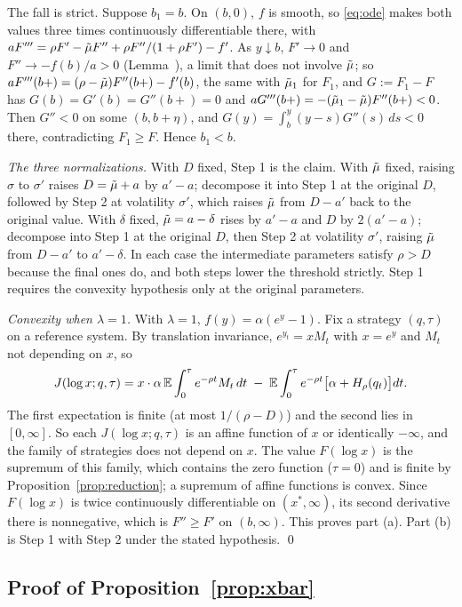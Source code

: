 The fall is strict. Suppose $b_1=b$. On $(b,0)$, $f$ is smooth, so \eqref{eq:ode} makes both values three times continuously differentiable there, with $aF'''=\rho F'-\tilde\mu F''+\rho F''/(1+\rho F')-f'$. As $y\downarrow b$, $F'\to0$ and $F''\to-f(b)/a>0$ (Lemma~), a limit that does not involve $\tilde\mu$; so $aF'''(b+)=(\rho-\tilde\mu)F''(b+)-f'(b)$, the same with $\tilde\mu_1$ for $F_1$, and $G:=F_1-F$ has $G(b)=G'(b)=G''(b+)=0$ and $aG'''(b+)=-(\tilde\mu_1-\tilde\mu)F''(b+)<0$. Then $G''<0$ on some $(b,b+\eta)$, and $G(y)=\int_b^y(y-s)G''(s)\,ds<0$ there, contradicting $F_1\ge F$. Hence $b_1<b$.

\emph{The three normalizations.} With $D$ fixed, Step 1 is the claim. With $\tilde\mu$ fixed, raising $\sigma$ to $\sigma'$ raises $D=\tilde\mu+a$ by $a'-a$; decompose it into Step 1 at the original $D$, followed by Step 2 at volatility $\sigma'$, which raises $\tilde\mu$ from $D-a'$ back to the original value. With $\delta$ fixed, $\tilde\mu=a-\delta$ rises by $a'-a$ and $D$ by $2(a'-a)$; decompose into Step 1 at the original $D$, then Step 2 at volatility $\sigma'$, raising $\tilde\mu$ from $D-a'$ to $a'-\delta$. In each case the intermediate parameters satisfy $\rho>D$ because the final ones do, and both steps lower the threshold strictly. Step 1 requires the convexity hypothesis only at the original parameters.

\emph{Convexity when $\lambda=1$.} With $\lambda=1$, $f(y)=\alpha(e^y-1)$. Fix a strategy $(q,\tau)$ on a reference system. By translation invariance, $e^{y_t}=xM_t$ with $x=e^y$ and $M_t$ not depending on $x$, so
\[
J(\log x;q,\tau)=x\cdot\alpha\,\mathbb{E}\int_0^\tau e^{-\rho t}M_t\,dt\;-\;\mathbb{E}\int_0^\tau e^{-\rho t}\big[\alpha+H_\rho(q_t)\big]dt .
\]
The first expectation is finite (at most $1/(\rho-D)$) and the second lies in $[0,\infty]$. So each $J(\log x;q,\tau)$ is an affine function of $x$ or identically $-\infty$, and the family of strategies does not depend on $x$. The value $F(\log x)$ is the supremum of this family, which contains the zero function ($\tau=0$) and is finite by Proposition~\ref{prop:reduction}; a supremum of affine functions is convex. Since $F(\log x)$ is twice continuously differentiable on $(x^*,\infty)$, its second derivative there is nonnegative, which is $F''\ge F'$ on $(b,\infty)$. This proves part (a). Part (b) is Step 1 with Step 2 under the stated hypothesis. \qed

\subsection*{Proof of Proposition~\ref{prop:xbar}}

